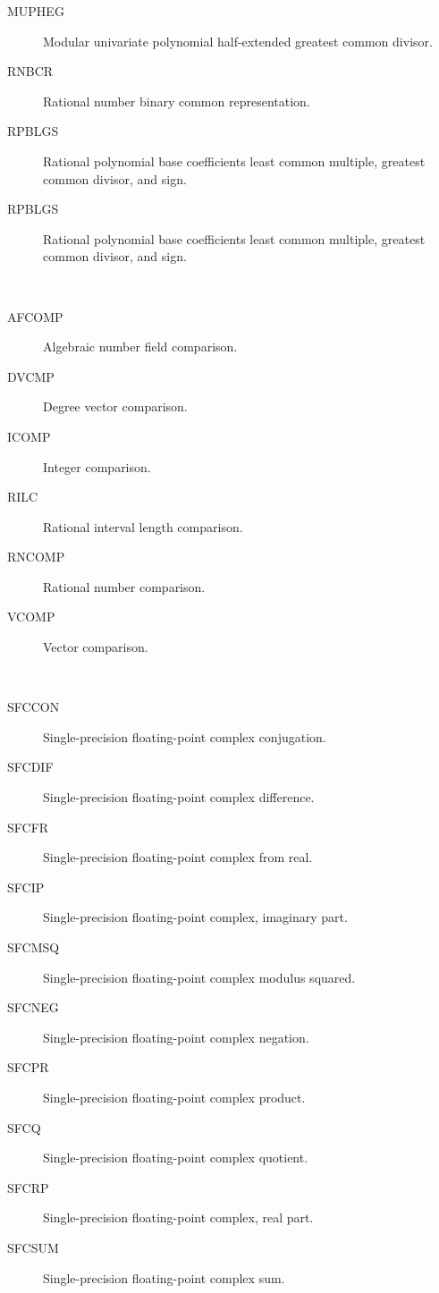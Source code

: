\begin{description}
\begin{description}
  \item[MUPHEG]  Modular univariate polynomial half-extended greatest common
    divisor.
  \item[RNBCR]  Rational number binary common representation.
  \item[RPBLGS]  Rational polynomial base coefficients least common multiple,
    greatest common divisor, and sign.
  \item[RPBLGS]  Rational polynomial base coefficients least common multiple,
    greatest common divisor, and sign.
  \end{description}
\item[comparison] \ \ 
  \begin{description}
  \item[AFCOMP]  Algebraic number field comparison.
  \item[DVCMP]  Degree vector comparison.
  \item[ICOMP]  Integer comparison.
  \item[RILC]  Rational interval length comparison.
  \item[RNCOMP]  Rational number comparison.
  \item[VCOMP]  Vector comparison.
  \end{description}
\item[complex] \ \ 
  \begin{description}
  \item[SFCCON]  Single-precision floating-point complex conjugation.
  \item[SFCDIF]  Single-precision floating-point complex difference.
  \item[SFCFR]  Single-precision floating-point complex from real.
  \item[SFCIP]  Single-precision floating-point complex, imaginary part.
  \item[SFCMSQ]  Single-precision floating-point complex modulus squared.
  \item[SFCNEG]  Single-precision floating-point complex negation.
  \item[SFCPR]  Single-precision floating-point complex product.
  \item[SFCQ]  Single-precision floating-point complex quotient.
  \item[SFCRP]  Single-precision floating-point complex, real part.
  \item[SFCSUM]  Single-precision floating-point complex sum.
  \end{description}
\item[composition] \ \ 

\end{description}
